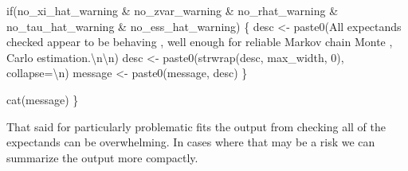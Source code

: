 \documentclass[
  letterpaper,
  DIV=11,
  numbers=noendperiod]{scrartcl}
\newenvironment{Shaded}{\begin{snugshade}}{\end{snugshade}}
\newcommand{\CharTok}[1]{\textcolor[rgb]{0.13,0.47,0.30}{#1}}
\newcommand{\ControlFlowTok}[1]{\textcolor[rgb]{0.00,0.23,0.31}{#1}}
\newcommand{\DecValTok}[1]{\textcolor[rgb]{0.68,0.00,0.00}{#1}}
\newcommand{\NormalTok}[1]{\textcolor[rgb]{0.00,0.23,0.31}{#1}}
\newcommand{\OperatorTok}[1]{\textcolor[rgb]{0.37,0.37,0.37}{#1}}
\newcommand{\StringTok}[1]{\textcolor[rgb]{0.13,0.47,0.30}{#1}}
\begin{document}
\begin{Shaded}
\begin{Highlighting}[]
  \ControlFlowTok{if}\NormalTok{(no\_xi\_hat\_warning }\OperatorTok{\&}\NormalTok{ no\_zvar\_warning }\OperatorTok{\&} 
\NormalTok{     no\_rhat\_warning }\OperatorTok{\&}\NormalTok{ no\_tau\_hat\_warning }\OperatorTok{\&}\NormalTok{ no\_ess\_hat\_warning) \{}
\NormalTok{    desc }\OperatorTok{\textless{}{-}}\NormalTok{ paste0(}\StringTok{\textquotesingle{}All expectands checked appear to be behaving \textquotesingle{}}\NormalTok{,}
                   \StringTok{\textquotesingle{}well enough for reliable Markov chain Monte \textquotesingle{}}\NormalTok{,}
                   \StringTok{\textquotesingle{}Carlo estimation.}\CharTok{\textbackslash{}n\textbackslash{}n}\StringTok{\textquotesingle{}}\NormalTok{)}
\NormalTok{    desc }\OperatorTok{\textless{}{-}}\NormalTok{ paste0(strwrap(desc, max\_width, }\DecValTok{0}\NormalTok{), collapse}\OperatorTok{=}\StringTok{\textquotesingle{}}\CharTok{\textbackslash{}n}\StringTok{\textquotesingle{}}\NormalTok{)}
\NormalTok{    message }\OperatorTok{\textless{}{-}}\NormalTok{ paste0(message, desc)}
\NormalTok{  \}}

\NormalTok{  cat(message)}
\NormalTok{\}}
\end{Highlighting}
\end{Shaded}

That said for particularly problematic fits the output from checking all
of the expectands can be overwhelming. In cases where that may be a risk
we can summarize the output more compactly.
\end{document}
